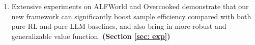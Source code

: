 \documentclass{article} %
\theoremstyle{plain}
\theoremstyle{definition}
\theoremstyle{remark}
\newcommand{\yan}[1]{{ \color{blue}[yan: #1]}}
\begin{document}
\begin{enumerate}
    \item {Extensive experiments on ALFWorld and Overcooked demonstrate that our new framework can significantly boost sample efficiency compared with both pure RL and pure LLM baselines, and also bring in more robust and generalizable value function. \textbf{(Section \ref{sec: exp})}}
    
    

    
\end{enumerate}

\iffalse
\end{document}
